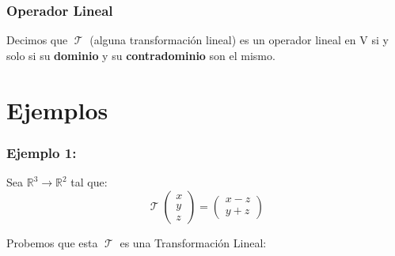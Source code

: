 \documentclass[12pt]{report}                                    %
\DeclareMathOperator \LinealTransformation {\mathcal{T}}        %
\DeclareMathOperator \LT {\mathcal{T}}                          %
\newcommand{\pVector}[1]{                                       %
        \ensuremath{\begin{pmatrix}#1\end{pmatrix}}                 %
    }
\begin{document}
        \subsubsection{Operador Lineal}
            Decimos que $\LinealTransformation$ (alguna transformación lineal) es un
            operador lineal en V si y solo si su \textbf{dominio} y su
            \textbf{contradominio} son el mismo.


    \clearpage
    \section{Ejemplos}

        \subsubsection{Ejemplo 1:}
            Sea $\mathbb{R}^3 \to \mathbb{R}^2$ tal que:
            \begin{equation*}
                \LinealTransformation \pVector{x\\y\\z}  = \pVector{x-z\\y+z}
            \end{equation*}

            Probemos que esta $\LT$ es una Transformación Lineal:
\end{document}
